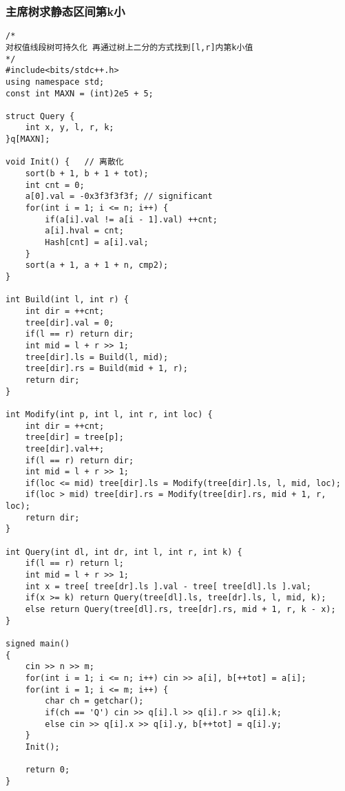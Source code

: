 \subsubsection{主席树求静态区间第k小}
\begin{lstlisting}
/*
对权值线段树可持久化 再通过树上二分的方式找到[l,r]内第k小值 
*/
#include<bits/stdc++.h>
using namespace std;
const int MAXN = (int)2e5 + 5;

struct Query {
	int x, y, l, r, k;
}q[MAXN];

void Init() {	// 离散化 
	sort(b + 1, b + 1 + tot);
	int cnt = 0;
	a[0].val = -0x3f3f3f3f;	// significant 
	for(int i = 1; i <= n; i++) {
		if(a[i].val != a[i - 1].val) ++cnt;
		a[i].hval = cnt;
		Hash[cnt] = a[i].val;
	}
	sort(a + 1, a + 1 + n, cmp2);
}

int Build(int l, int r) {
	int dir = ++cnt;
	tree[dir].val = 0;
	if(l == r) return dir;
	int mid = l + r >> 1;
	tree[dir].ls = Build(l, mid);
	tree[dir].rs = Build(mid + 1, r);
	return dir;
}

int Modify(int p, int l, int r, int loc) {
	int dir = ++cnt;
	tree[dir] = tree[p];
	tree[dir].val++;
	if(l == r) return dir;
	int mid = l + r >> 1;
	if(loc <= mid) tree[dir].ls = Modify(tree[dir].ls, l, mid, loc); 
	if(loc > mid) tree[dir].rs = Modify(tree[dir].rs, mid + 1, r, loc);
	return dir;
}

int Query(int dl, int dr, int l, int r, int k) { 
	if(l == r) return l;
	int mid = l + r >> 1;
	int x = tree[ tree[dr].ls ].val - tree[ tree[dl].ls ].val;
	if(x >= k) return Query(tree[dl].ls, tree[dr].ls, l, mid, k);
	else return Query(tree[dl].rs, tree[dr].rs, mid + 1, r, k - x);
}

signed main()
{
	cin >> n >> m;
	for(int i = 1; i <= n; i++) cin >> a[i], b[++tot] = a[i];
	for(int i = 1; i <= m; i++) {
		char ch = getchar();
		if(ch == 'Q') cin >> q[i].l >> q[i].r >> q[i].k;
		else cin >> q[i].x >> q[i].y, b[++tot] = q[i].y;
	}
	Init();
	
	return 0;
}
\end{lstlisting}

